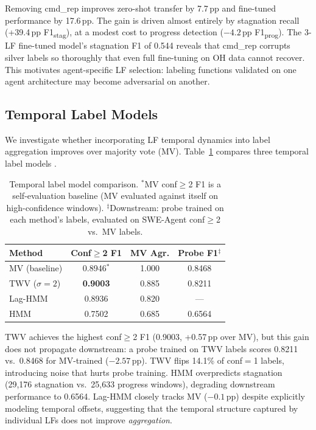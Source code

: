 Removing cmd\_rep improves zero-shot transfer by 7.7\,pp and fine-tuned performance by 17.6\,pp.
The gain is driven almost entirely by stagnation recall (+39.4\,pp F1\textsubscript{stag}), at a modest cost to progress detection ($-4.2$\,pp F1\textsubscript{prog}).
The 3-LF fine-tuned model's stagnation F1 of 0.544 reveals that cmd\_rep corrupts silver labels so thoroughly that even full fine-tuning on OH data cannot recover.
This motivates agent-specific LF selection: labeling functions validated on one agent architecture may become adversarial on another.

\subsection{Temporal Label Models}
\label{sec:temporal_label_models}

We investigate whether incorporating LF temporal dynamics into label aggregation improves over majority vote (MV).
Table~\ref{tab:temporal_models} compares three temporal label models \citep{ratner2017snorkel,safranchik2020linkedhmm}.

\begin{table}[t]
\centering
\small
\begin{tabular}{lccc}
\toprule
\textbf{Method} & \textbf{Conf${\geq}$2 F1} & \textbf{MV Agr.} & \textbf{Probe F1$^\ddagger$} \\
\midrule
MV (baseline) & 0.8946$^\ast$ & 1.000 & 0.8468 \\
TWV ($\sigma{=}2$) & \textbf{0.9003} & 0.885 & 0.8211 \\
Lag-HMM & 0.8936 & 0.820 & --- \\
HMM & 0.7502 & 0.685 & 0.6564 \\
\bottomrule
\end{tabular}
\caption{Temporal label model comparison. $^\ast$MV conf${\geq}$2 F1 is a self-evaluation baseline (MV evaluated against itself on high-confidence windows). $^\ddagger$Downstream: probe trained on each method's labels, evaluated on SWE-Agent conf${\geq}$2 vs.\ MV labels.}
\label{tab:temporal_models}
\end{table}

TWV achieves the highest conf${\geq}$2 F1 (0.9003, +0.57\,pp over MV), but this gain does not propagate downstream: a probe trained on TWV labels scores 0.8211 vs.\ 0.8468 for MV-trained ($-2.57$\,pp).
TWV flips 14.1\% of conf$=$1 labels, introducing noise that hurts probe training.
HMM overpredicts stagnation (29,176 stagnation vs.\ 25,633 progress windows), degrading downstream performance to 0.6564.
Lag-HMM closely tracks MV ($-0.1$\,pp) despite explicitly modeling temporal offsets, suggesting that the temporal structure captured by individual LFs does not improve \emph{aggregation}.

